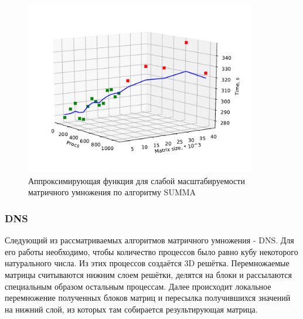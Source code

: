 		\begin{figure}
			\centering
			\includegraphics[width=0.9\textwidth]{./images/graph_SUMMA}
			\caption{Аппроксимирующая функция для слабой масштабируемости матричного умножения по алгоритму SUMMA}
			\label{graph_SUMMA}
		\end{figure}

		\subsubsection{DNS}
			Следующий из рассматриваемых алгоритмов матричного умножения - DNS. Для его работы необходимо, чтобы количество процессов было равно кубу некоторого натурального числа. Из этих процессов создаётся 3D решётка. Перемножаемые матрицы считываются нижним слоем решётки, делятся на блоки и рассылаются специальным образом остальным процессам. Далее происходит локальное перемножение полученных блоков матриц и пересылка получившихся значений на нижний слой, из которых там собирается результирующая матрица.

